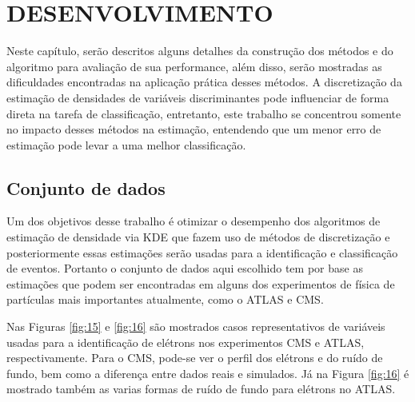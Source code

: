 \chapter{DESENVOLVIMENTO} \label{cap:desenvolvimento}
\vspace{-2cm}
Neste capítulo, serão descritos alguns detalhes da construção dos métodos e do algoritmo para avaliação de sua performance, além disso, serão mostradas as dificuldades encontradas na aplicação prática desses métodos. A discretização da estimação de densidades de variáveis discriminantes pode influenciar de forma direta na tarefa de classificação, entretanto, este trabalho se concentrou somente no impacto desses métodos na estimação, entendendo que um menor erro de estimação pode levar a uma melhor classificação.

\section{Conjunto de dados}

Um dos objetivos desse trabalho é otimizar o desempenho dos algoritmos de estimação de densidade via KDE que fazem uso de métodos de discretização e posteriormente essas estimações serão usadas para a identificação e classificação de eventos. Portanto o conjunto de dados aqui escolhido tem por base as estimações que podem ser encontradas em alguns dos experimentos de física de partículas mais importantes atualmente, como o ATLAS e \ac{CMS}.

Nas Figuras \ref{fig:15} e \ref{fig:16} são mostrados casos representativos de variáveis usadas para a identificação de elétrons nos experimentos CMS e ATLAS, respectivamente. Para o CMS, pode-se ver o perfil dos elétrons e do ruído de fundo, bem como a diferença entre dados reais e simulados. Já na Figura \ref{fig:16} é mostrado também as varias formas de ruído de fundo para elétrons no ATLAS.


